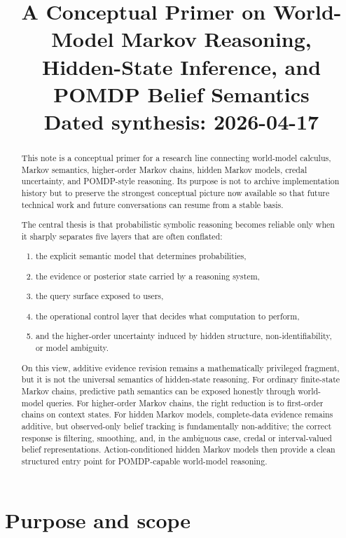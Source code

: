 \documentclass[11pt]{article}
\title{A Conceptual Primer on World-Model Markov Reasoning,\\Hidden-State Inference, and POMDP Belief Semantics\\\large Dated synthesis: 2026-04-17}
\author{}
\date{}
\begin{document}
\maketitle

\begin{abstract}
This note is a conceptual primer for a research line connecting world-model
calculus, Markov semantics, higher-order Markov chains, hidden Markov models,
credal uncertainty, and POMDP-style reasoning.  Its purpose is not to archive
implementation history but to preserve the strongest conceptual picture now
available so that future technical work and future conversations can resume
from a stable basis.

The central thesis is that probabilistic symbolic reasoning becomes reliable
only when it sharply separates five layers that are often conflated:
\begin{enumerate}
  \item the explicit semantic model that determines probabilities,
  \item the evidence or posterior state carried by a reasoning system,
  \item the query surface exposed to users,
  \item the operational control layer that decides what computation to perform,
  \item and the higher-order uncertainty induced by hidden structure,
        non-identifiability, or model ambiguity.
\end{enumerate}

On this view, additive evidence revision remains a mathematically privileged
fragment, but it is not the universal semantics of hidden-state reasoning.  For
ordinary finite-state Markov chains, predictive path semantics can be exposed
honestly through world-model queries.  For higher-order Markov chains, the
right reduction is to first-order chains on context states.  For hidden Markov
models, complete-data evidence remains additive, but observed-only belief
tracking is fundamentally non-additive; the correct response is filtering,
smoothing, and, in the ambiguous case, credal or interval-valued belief
representations.  Action-conditioned hidden Markov models then provide a clean
structured entry point for POMDP-capable world-model reasoning.
\end{abstract}

\tableofcontents

\section{Purpose and scope}
\end{document}
